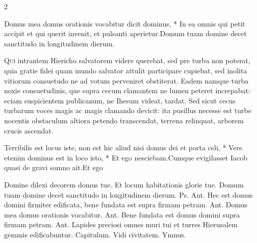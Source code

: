 \begin{multicols*}{2}
\begin{responsory}
{Domus mea domus orationis vocabitur dicit dominus, * In ea omnis qui petit accipit et qui querit invenit, et pulsanti aperietur.}{Domum tuam domine decet sanctitudo in longitudinem dierum.}
\end{responsory}%
\lettrine[lines=2]{\zallmancaps \color{Red} Q}{ui} intrantem Hiericho salvatorem videre querebat, sed pre turba non poterat, quia gratie fidei quam mundo salvator attulit participare cupiebat, sed inolita vitiorum consuetudo ne ad votum perveniret obstiterat. Eadem namque turba noxie consuetudinis, que supra cecum clamantem ne lumen peteret increpabat: eciam suspicientem publicanum, ne Ihesum videat, tardat. Sed sicut cecus turbarum voces magis ac magis clamando devicit: ita pusillus necesse est turbe nocentis obstaculum altiora petendo transcendat, terrena relinquat, arborem crucis ascendat.
\begin{responsory-final}
{Terribilis est locus iste, non est hic aliud nisi domus dei et porta celi, * Vere etenim dominus est in loco isto, * Et ego nesciebam.}{Cumque evigilasset Iacob quasi de gravi somno ait.}{Et ego}
\end{responsory-final}%
\newline \V Domine dilexi decorem domus tue. \R Et locum habitationis glorie tue.
 Domum tuam domine decet sanctitudo in longitudinem dierum. {\color{Red} Ps.}  {\color{Red} Ant.} Hec est domus domini firmiter edificata, bene fundata est supra firmam petram. {\color{Red} Ant.} Domus mea domus orationis vocabitur. {\color{Red} Ant.} Bene fundata est domus domini supra firmam petram. {\color{Red} Ant.} Lapides preciosi omnes muri tui et turres Hierusalem gemmis edificabuntur. {\color{Red} Capitulum.} Vidi civitatem. {\color{Red} Ymnus.}
\end{multicols*}
